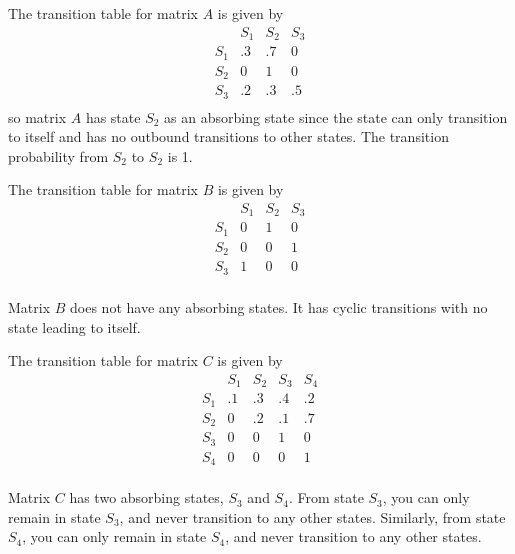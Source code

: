 \begin{solution}
    The transition table for matrix $A$ is given by
    \[
        \begin{array}{c|ccc}
                & S_1 & S_2 & S_3 \\
            \hline
            S_1 & .3  & .7  & 0   \\
            S_2 & 0   & 1   & 0   \\
            S_3 & .2  & .3  & .5  \\
        \end{array}
    \]
    so matrix \( A \) has state \( S_2 \) as an absorbing state since the state can only transition to itself and has no outbound transitions to other states. The transition probability from \( S_2 \) to \( S_2 \) is 1.

    The transition table for matrix $B$ is given by
    \[
        \begin{array}{c|ccc}
                & S_1 & S_2 & S_3 \\
            \hline
            S_1 & 0   & 1   & 0   \\
            S_2 & 0   & 0   & 1   \\
            S_3 & 1   & 0   & 0   \\
        \end{array}
    \]

    Matrix \( B \) does not have any absorbing states. It has cyclic transitions with no state leading to itself.

    The transition table for matrix $C$ is given by
    \[
        \begin{array}{c|cccc}
                & S_1 & S_2 & S_3 & S_4 \\
            \hline
            S_1 & .1  & .3  & .4  & .2  \\
            S_2 & 0   & .2  & .1  & .7  \\
            S_3 & 0   & 0   & 1   & 0   \\
            S_4 & 0   & 0   & 0   & 1   \\
        \end{array}
    \]

    Matrix \( C \) has two absorbing states, \( S_3 \) and \( S_4 \). From state \( S_3 \), you can only remain in state \( S_3 \), and never transition to any other states. Similarly, from state \( S_4 \), you can only remain in state \( S_4 \), and never transition to any other states.
\end{solution}

